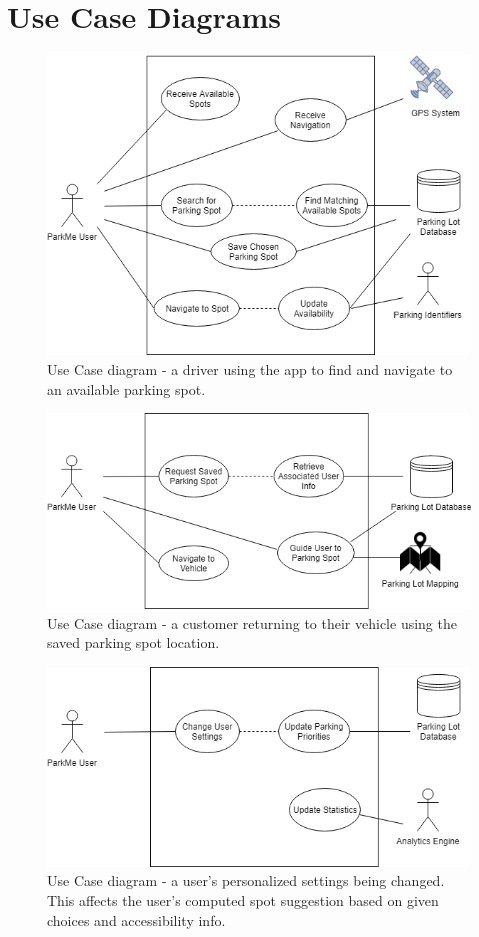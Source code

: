 \documentclass[]{article}
\begin{document}
\section{Use Case Diagrams}
\begin{figure}[H]
    \centering
    \includegraphics[width=\textwidth,height=\textheight,keepaspectratio]{uc1}
    \caption{Use Case diagram - a driver using the app to find and navigate to an available parking spot.}
    \label{fig:uc1}
\end{figure}
\begin{figure}[H]
    \centering
    \includegraphics[width=\textwidth,height=\textheight,keepaspectratio]{uc2}
    \caption{Use Case diagram - a customer returning to their vehicle using the saved parking spot location.}
    \label{fig:uc2}
\end{figure}
\begin{figure}[H]
    \centering
    \includegraphics[width=\textwidth,height=\textheight,keepaspectratio]{uc3}
    \caption{Use Case diagram - a user’s personalized settings being changed. This affects the user’s computed spot suggestion based on given choices and accessibility info.}
    \label{fig:uc3}
\end{figure}
\end{document}
